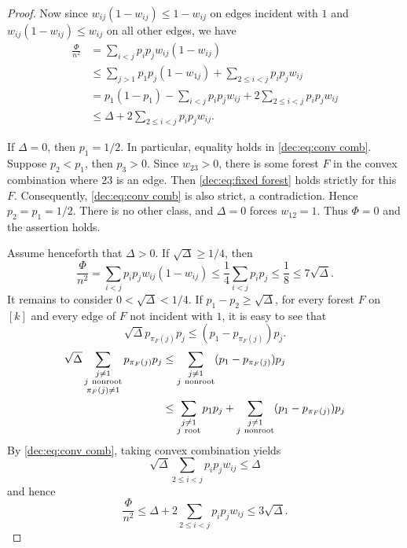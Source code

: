\documentclass[11pt]{article}
\numberwithin{equation}{section}
\theoremstyle{remark}
\begin{document}
\begin{proof}
Now since \(w_{ij}(1-w_{ij})\le1-w_{ij}\) on edges incident with \(1\) and
\(w_{ij}(1-w_{ij})\le w_{ij}\) on all other edges, we have
\begin{equation}\label{dec:eq:Phi bound}
\begin{aligned}
  \frac{\Phi}{n^2} &= \sum_{i<j}p_ip_jw_{ij}(1-w_{ij})\\
  &\le \sum_{j>1}p_1p_j(1-w_{1j}) + \sum_{2\le i<j}p_ip_jw_{ij}\\
  &= p_1(1-p_1) - \sum_{i<j}p_ip_jw_{ij} + 2\sum_{2\le i<j}p_ip_jw_{ij}\\
  &\le \Delta + 2\sum_{2\le i<j}p_ip_jw_{ij}.
\end{aligned}
\end{equation}

If \(\Delta=0\), then \(p_1=1/2\). In particular, equality holds in \eqref{dec:eq:conv comb}.
Suppose \(p_2<p_1\), then \(p_3>0\).
Since \(w_{23}>0\), there is some forest \(F\) in the convex combination where
\(23\) is an edge.
Then \eqref{dec:eq:fixed forest} holds strictly for this \(F\).
Consequently, \eqref{dec:eq:conv comb} is also strict, a contradiction. Hence \(p_2=p_1=1/2\).
There is no other class, and \(\Delta=0\) forces \(w_{12}=1\). Thus \(\Phi=0\) and the assertion holds.

Assume henceforth that \(\Delta>0\).  If \(\sqrt{\Delta}\ge1/4\), then
\begin{equation*}
 \frac{\Phi}{n^2}=\sum_{i<j}p_ip_jw_{ij}(1-w_{ij})\le\frac14\sum_{i<j}p_ip_j\le\frac18\le7\sqrt{\Delta}.
\end{equation*}
It remains to consider \(0<\sqrt{\Delta}<1/4\). If \(p_1-p_2\ge \sqrt{\Delta}\),
for every forest \(F\) on \([k]\) and every edge of \(F\) not incident with \(1\), it is easy to see that
\begin{equation*}
 \sqrt{\Delta}p_{\pi_F(j)}p_j
 \le (p_1-p_{\pi_F(j)})p_j.
\end{equation*}
\begin{equation*}
\begin{aligned}
\sqrt{\Delta}\sum_{\substack{j\ne1\\j\ {\rm nonroot}\\\pi_F(j)\ne1}}p_{\pi_F(j)}p_j
 &\le \sum_{\substack{j\ne1\\j\ {\rm nonroot}}}(p_1-p_{\pi_F(j)})p_j\\
 &\le \sum_{\substack{j\ne1\\j\ {\rm root}}}p_1p_j  +\sum_{\substack{j\ne1\\j\ {\rm nonroot}}}(p_1-p_{\pi_F(j)})p_j
\end{aligned}
\end{equation*}
By \eqref{dec:eq:conv comb}, taking convex combination yields
\begin{equation*}\sqrt{\Delta}\sum_{2\le i<j}p_ip_jw_{ij}\le\Delta\end{equation*}
and hence
\begin{equation*}
 \frac{\Phi}{n^2}\le \Delta+2\sum_{2\le i<j}p_ip_jw_{ij}\le 3\sqrt{\Delta}.
\end{equation*}


\end{proof}
\end{document}
